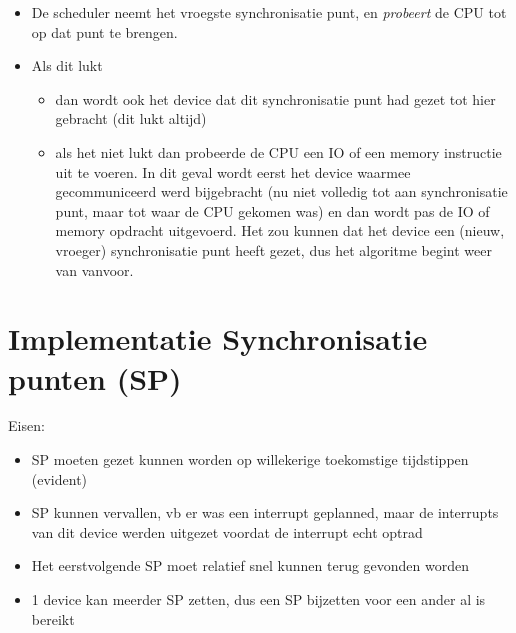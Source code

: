 \documentclass[11pt, a4paper]{report}
\begin{document}
\begin{itemize}
\item De scheduler neemt het vroegste synchronisatie punt, en \textit{probeert}
de CPU tot op dat punt te brengen.
\item Als dit lukt
	\begin{itemize}
	\item dan wordt ook het device dat dit synchronisatie punt had gezet tot
	hier gebracht (dit lukt altijd)
	\item als het niet lukt dan probeerde de CPU een IO of een memory instructie
	uit te voeren. In dit geval wordt eerst het device waarmee gecommuniceerd
	werd bijgebracht (nu niet volledig tot aan synchronisatie punt, maar tot
	waar de CPU gekomen was) en dan wordt pas de IO of memory opdracht 
	uitgevoerd. Het zou kunnen dat het device een (nieuw, vroeger) 
	synchronisatie punt heeft gezet, dus het algoritme begint weer van 
	vanvoor.
	\end{itemize}
\end{itemize}
       



\section{Implementatie Synchronisatie punten (SP)}

Eisen:
\begin{itemize}
\item SP moeten gezet kunnen worden op willekerige toekomstige tijdstippen 
(evident)
\item SP kunnen vervallen, vb er was een interrupt geplanned, maar de interrupts
van dit device werden uitgezet voordat de interrupt echt optrad
\item Het eerstvolgende SP moet relatief snel kunnen terug gevonden worden
\item 1 device kan meerder SP zetten, dus een SP bijzetten voor een ander al is
bereikt
\end{itemize}
\end{document}

